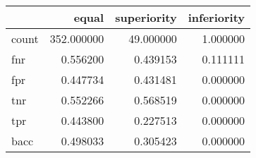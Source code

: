 \begin{tabular}{lrrr}
\toprule
{} &       equal &  superiority &  inferiority \\
\midrule
count &  352.000000 &    49.000000 &     1.000000 \\
fnr   &    0.556200 &     0.439153 &     0.111111 \\
fpr   &    0.447734 &     0.431481 &     0.000000 \\
tnr   &    0.552266 &     0.568519 &     0.000000 \\
tpr   &    0.443800 &     0.227513 &     0.000000 \\
bacc  &    0.498033 &     0.305423 &     0.000000 \\
\bottomrule
\end{tabular}
